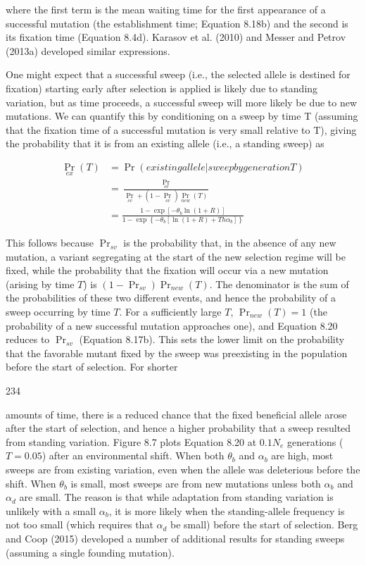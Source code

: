 \documentclass{article}
\begin{document}
where the first term is the mean waiting time for the first appearance of a successful mutation (the establishment time; Equation 8.18b) and the second is its fixation time (Equation 8.4d). Karasov et al. (2010) and Messer and Petrov (2013a) developed similar expressions.

One might expect that a successful sweep (i.e., the selected allele is destined for fixation) starting early after selection is applied is likely due to standing variation, but as time proceeds, a successful sweep will more likely be due to new mutations. We can quantify this by conditioning on a sweep by time T (assuming that the fixation time of a successful mutation is very small relative to T), giving the probability that it is from an existing allele (i.e., a standing sweep) as

\begin{equation}
\begin{aligned}\Pr_{ex}(T)&=\Pr(existing allele|sweep by generation T)\\&=\frac{\Pr_{sv}}{\Pr_{sv}+(1-\Pr_{sv})\Pr_{new}(T)}\\&=\frac{1-\exp\left[-\theta_{b}\ln(1+R)\right]}{1-\exp\left\{-\theta_{b}[\ln(1+R)+Th\alpha_{b}]\right\}}\end{aligned}
\tag{8.20}
\label{eq:8_20}
\end{equation}

This follows because  $ \Pr_{sv} $ is the probability that, in the absence of any new mutation, a variant segregating at the start of the new selection regime will be fixed, while the probability that the fixation will occur via a new mutation (arising by time  $ T $) is  $ (1 - \Pr_{sv}) \Pr_{new}(T) $. The denominator is the sum of the probabilities of these two different events, and hence the probability of a sweep occurring by time  $ T $. For a sufficiently large  $ T $,  $ \Pr_{new}(T) = 1 $ (the probability of a new successful mutation approaches one), and Equation 8.20 reduces to  $ \Pr_{sv} $ (Equation 8.17b). This sets the lower limit on the probability that the favorable mutant fixed by the sweep was preexisting in the population before the start of selection. For shorter

234

amounts of time, there is a reduced chance that the fixed beneficial allele arose after the start of selection, and hence a higher probability that a sweep resulted from standing variation. Figure 8.7 plots Equation 8.20 at  $ 0.1N_{e} $ generations ( $ T = 0.05 $) after an environmental shift. When both  $ \theta_{b} $ and  $ \alpha_{b} $ are high, most sweeps are from existing variation, even when the allele was deleterious before the shift. When  $ \theta_{b} $ is small, most sweeps are from new mutations unless both  $ \alpha_{b} $ and  $ \alpha_{d} $ are small. The reason is that while adaptation from standing variation is unlikely with a small  $ \alpha_{b} $, it is more likely when the standing-allele frequency is not too small (which requires that  $ \alpha_{d} $ be small) before the start of selection. Berg and Coop (2015) developed a number of additional results for standing sweeps (assuming a single founding mutation).
\end{document}
